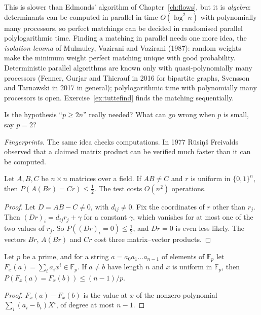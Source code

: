 This is slower than Edmonds' algorithm of Chapter~\ref{ch:flows}, but it is \emph{algebra}: determinants can be computed in parallel in time $O(\log^2n)$ with polynomially many processors, so perfect matchings can be decided in randomised parallel polylogarithmic time. Finding a matching in parallel needs one more
idea, the \emph{isolation lemma} of Mulmuley, Vazirani and Vazirani (1987): random weights make the minimum weight perfect matching unique with good probability. Deterministic parallel algorithms are known only with quasi-polynomially many processors (Fenner, Gurjar and Thierauf in 2016 for bipartite graphs, Svensson and Tarnawski in 2017 in general); polylogarithmic time with polynomially many processors is open.
Exercise~\ref{ex:tuttefind} finds the matching sequentially.

\begin{think}
Is the hypothesis ``$p\ge2n$'' really needed? What can go wrong when $p$ is small, say $p=2$?
\end{think}

\emph{Fingerprints.} The same idea checks computations. In 1977 R\=usi\c n\v s Freivalds observed that a claimed matrix product can be verified much faster than it can be computed.

\begin{proposition}[Freivalds, 1977]\label{prop:freivalds}
Let $A,B,C$ be $n\times n$ matrices over a field. If $AB\ne C$ and $r$ is uniform in $\{0,1\}^n$, then $P(A(Br)=Cr)\le\tfrac12$. The test costs $O(n^2)$ operations.
\end{proposition}
\begin{proof}
Let $D=AB-C\ne0$, with $d_{ij}\ne0$. Fix the coordinates of $r$ other than $r_j$. Then $(Dr)_i=d_{ij}r_j+\gamma$ for a constant $\gamma$, which vanishes for at most one of the two values of $r_j$. So $P((Dr)_i=0)\le\tfrac12$, and
$Dr=0$ is even less likely. The vectors $Br$, $A(Br)$ and $Cr$ cost three matrix--vector products.
\end{proof}

\begin{proposition}\label{prop:fingerprint}
Let $p$ be a prime, and for a string $a=a_0a_1\dots a_{n-1}$ of elements of $\mathbb F_p$ let $F_x(a)=\sum_ia_ix^i\in\mathbb F_p$. If $a\ne b$ have length $n$ and $x$ is uniform in $\mathbb F_p$, then $P(F_x(a)=F_x(b))\le(n-1)/p$.
\end{proposition}
\begin{proof}
$F_x(a)-F_x(b)$ is the value at $x$ of the nonzero polynomial $\sum_i(a_i-b_i)X^i$, of degree at most $n-1$.
\end{proof}

